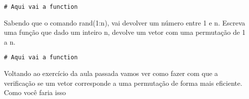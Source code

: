 \documentclass[a4paper]{article}
\begin{document}
\begin{enumerate}
\lstset{language=ein-julia,label= ,caption= ,captionpos=b,numbers=none}
\begin{lstlisting}
# Aqui vai a function
\end{lstlisting}
Sabendo que o comando rand(1:n), vai devolver um número entre 1 e n.
Escreva uma função que dado um inteiro n, devolve um vetor com uma
permutação de 1 a n.

\lstset{language=ein-julia,label= ,caption= ,captionpos=b,numbers=none}
\begin{lstlisting}
# Aqui vai a function
\end{lstlisting}

Voltando ao exercício da aula passada vamos ver como fazer com
que a verificação se um vetor corresponde a uma permutação de forma mais
eficiente. Como você faria isso
\end{enumerate}
\end{document}
